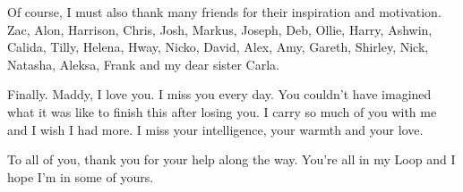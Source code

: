 Of course, I must also thank many friends for their inspiration and motivation. Zac, Alon, Harrison, Chris, Josh, Markus, Joseph, Deb, Ollie, Harry, Ashwin, Calida, Tilly, Helena, Hway, Nicko, David, Alex, Amy, Gareth, Shirley, Nick, Natasha, Aleksa, Frank and my dear sister Carla.

Finally. Maddy, I love you. I miss you every day. You couldn't have imagined what it was like to finish this after losing you. I carry so much of you with me and I wish I had more. I miss your intelligence, your warmth and your love.

To all of you, thank you for your help along the way. You're all in my Loop \cite{hofstadter2007} and I hope I'm in some of yours.
